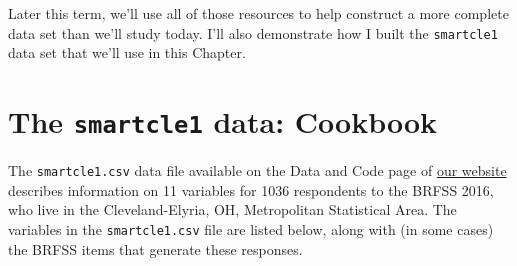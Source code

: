 \documentclass[]{book}
\theoremstyle{definition}
\theoremstyle{definition}
\theoremstyle{definition}
\theoremstyle{remark}
\begin{document}
Later this term, we'll use all of those resources to help construct a
more complete data set than we'll study today. I'll also demonstrate how
I built the \texttt{smartcle1} data set that we'll use in this Chapter.

\section{\texorpdfstring{The \texttt{smartcle1} data:
Cookbook}{The smartcle1 data: Cookbook}}\label{the-smartcle1-data-cookbook}

The \texttt{smartcle1.csv} data file available on the Data and Code page
of \href{https://github.com/THOMASELOVE/432-2018}{our website} describes
information on 11 variables for 1036 respondents to the BRFSS 2016, who
live in the Cleveland-Elyria, OH, Metropolitan Statistical Area. The
variables in the \texttt{smartcle1.csv} file are listed below, along
with (in some cases) the BRFSS items that generate these responses.
\end{document}
